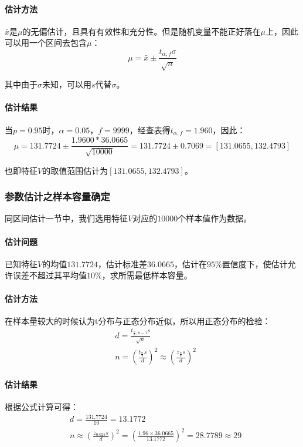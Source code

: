 \documentclass[UTF8]{ctexart}
\begin{document}
	\paragraph{估计方法} $\bar{x}$是$\mu$的无偏估计，且具有有效性和充分性。但是随机变量不能正好落在$\mu$上，因此可以用一个区间去包含$\mu$：
	\begin{equation*}
	\mu = \bar{x} \pm \frac{t_{\alpha, f}\sigma}{\sqrt{n}}
	\end{equation*}
	
	其中由于$\sigma$未知，可以用$s$代替$\sigma$。
	
	\paragraph{估计结果} 当$p=0.95$时，$\alpha=0.05$，$f=9999$，经查表得$t_{\alpha, f}=1.960$，因此：
	\begin{equation*}
	\mu = 131.7724 \pm \frac{1.9600 * 36.0665}{\sqrt{10000}} = 131.7724 \pm 0.7069 = [131.0655, 132.4793]
	\end{equation*}
	
	也即特征$V$的取值范围估计为$[131.0655, 132.4793]$。
	
	\subsubsection{参数估计之样本容量确定}
	同区间估计一节中，我们选用特征$V$对应的$10000$个样本值作为数据。
	
	\paragraph{估计问题} 已知特征$V$的均值$131.7724$，估计标准差$36.0665$，估计在$95\%$置信度下，使估计允许误差不超过其平均值$10\%$，求所需最低样本容量。
	
	\paragraph{估计方法} 在样本量较大的时候认为t分布与正态分布近似，所以用正态分布的检验：
	\begin{align*}
	& d = \frac{t_{\frac{\alpha}{2},n-1}s}{\sqrt{n}} \\
	& n = (\frac{t_{\frac{\alpha}{2}}s}{d})^2 \approx (\frac{z_{\frac{\alpha}{2}}s}{d})^2
	\end{align*}

	\paragraph{估计结果} 根据公式计算可得：
	\begin{align*}
	& d = \frac{131.7724}{10} = 13.1772 \\
	& n \approx (\frac{z_{0.025}s}{d})^2 = (\frac{1.96\times 36.0665}{13.1772})^2 = 28.7789 \approx 29
	\end{align*}
	
\end{document}
